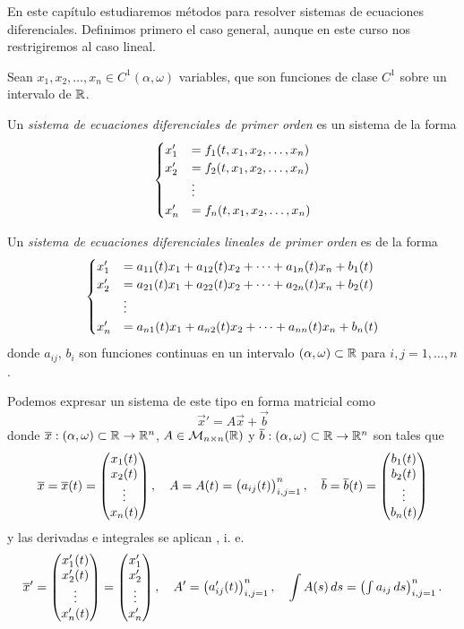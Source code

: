 \documentclass[../ecuaciones_diferenciales.tex]{subfiles}
\begin{document}
En este capítulo estudiaremos métodos para resolver sistemas de ecuaciones
diferenciales. Definimos primero el caso general, aunque en este curso nos
restrigiremos al caso lineal.

Sean \(x_1, x_2, \dots, x_n \in C^1(\alpha, \omega)\) variables, que son
funciones de clase \(C^1\) sobre un intervalo de \(\mathbb{R}\).

\begin{definition}
	Un \emph{sistema de ecuaciones diferenciales de primer orden} es un sistema de la
	forma
	\[\begin{cases}
			x'_1 &= f_1(t, x_1, x_2, \dots, x_n) \\
			x'_2 &= f_2(t, x_1, x_2, \dots, x_n) \\
			&\vdots \\
			x'_n &= f_n(t, x_1, x_2, \dots, x_n)\end{cases}\]
\end{definition}

\begin{definition}
	\label{def:siseq1ord}
	Un \emph{sistema de ecuaciones diferenciales lineales de primer orden} es de la
	forma
	\[\begin{cases}
			x'_1 &= a_{11}(t)x_1 + a_{12}(t)x_2 + \dots + a_{1n}(t)x_n + b_1(t) \\
			x'_2 &= a_{21}(t)x_1 + a_{22}(t)x_2 + \dots + a_{2n}(t)x_n + b_2(t) \\
			&\vdots \\
			x'_n &= a_{n1}(t)x_1 + a_{n2}(t)x_2 + \dots + a_{nn}(t)x_n + b_n(t)\end{cases}\]
	donde \(a_{ij}\), \(b_i\) son funciones continuas en un intervalo
	\((\alpha, \omega) \subset \mathbb{R}\) para \(i,j = 1, \dots, n\).
\end{definition}

Podemos expresar un sistema de este tipo en forma matricial como
\[\vec{x}' = A\vec{x} + \vec{b}\]
donde \(\overline{x} : (\alpha, \omega) \subset \mathbb{R} \to \mathbb{R}^n\),
\(A \in \mathcal{M}_{n \times n}(\mathbb{R})\) y
\(\overline{b} : (\alpha, \omega) \subset \mathbb{R} \to \mathbb{R}^n\) son tales que
\[\overline{x} = \overline{x}(t) = \begin{pmatrix}x_1(t) \\ x_2(t) \\ \vdots \\ x_n(t)\end{pmatrix}, \quad
	A = A(t) = \begin{pmatrix}a_{ij}(t)\end{pmatrix}^n_{i,j = 1},\quad
	\overline{b} = \overline{b}(t) = \begin{pmatrix}b_1(t) \\ b_2(t) \\ \vdots \\ b_n(t)\end{pmatrix} \]
y las derivadas e integrales se aplican ,
i. e.
\[\overline{x}' = \begin{pmatrix}x'_1(t) \\ x'_2(t) \\ \vdots \\ x'_n(t)\end{pmatrix}
	= \begin{pmatrix}x'_1 \\ x'_2 \\ \vdots \\ x'_n\end{pmatrix}, \quad
	A' = \begin{pmatrix}a'_{ij}(t)\end{pmatrix}^n_{i,j = 1}, \quad
	\int A(s) \mathop{d\!} s = \begin{pmatrix}\int a_{ij} \mathop{d\!} s\end{pmatrix}^n_{i,j = 1}.\]
\end{document}
